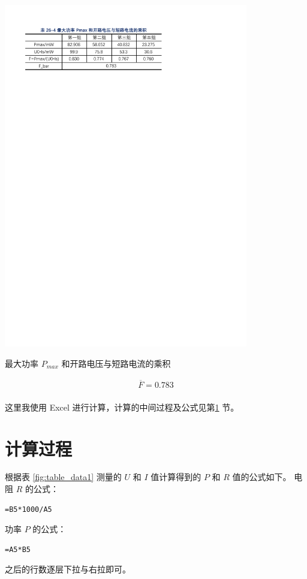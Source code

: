 \documentclass[12pt]{article}
\begin{document}
\begin{table}[H] %
    \centering
    \includegraphics[width=0.8\textwidth]{./figures/表4.pdf} 
    \caption{最大功率 $P_{max}$ 和开路电压与短路电流的乘积}
    \label{fig:table_data4}
\end{table}

\begin{align*}
    \overline F  = 0.783 \\
\end{align*}

这里我使用 Excel 进行计算，计算的中间过程及公式见第\ref{sec:calculation_process} 节。

\FloatBarrier

\section{\normalfont 计算过程}
\label{sec:calculation_process}

根据表 \ref{fig:table_data1} 测量的 $U$ 和 $I$ 值计算得到的 $P$ 和 $R$ 值的公式如下。
\newline \newline 电阻 $R$ 的公式：
\begin{Verbatim}[frame=single, fontsize=\small]
    =B5*1000/A5
\end{Verbatim}
功率 $P$ 的公式：
\begin{Verbatim}[frame=single, fontsize=\small]
    =A5*B5
\end{Verbatim}
之后的行数逐层下拉与右拉即可。
\end{document}
